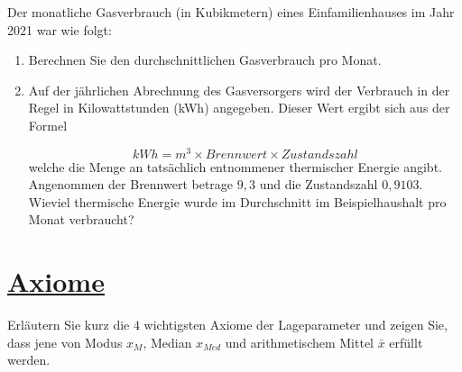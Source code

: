 \documentclass[12pt,a4paper]{article}
\newcommand{\tmpsection}[1]{}
\let\tmpsection=\section
\renewcommand{\section}[1]{\tmpsection{\underline{#1}} }
\begin{document}
Der monatliche Gasverbrauch (in Kubikmetern) eines Einfamilienhauses im
Jahr 2021 war wie folgt:

\FloatBarrier
\begin{table}[htp]
  \centering
\end{table}
\FloatBarrier

\begin{enumerate}[label=(\alph*)]
  \item Berechnen Sie den durchschnittlichen Gasverbrauch pro Monat.
  \item Auf der jährlichen Abrechnung des Gasversorgers wird der Verbrauch in der Regel in Kilowattstunden (kWh) angegeben. Dieser Wert ergibt sich aus der Formel
  
  $$kWh = m^3 \times Brennwert \times Zustandszahl$$
  welche die Menge an tatsächlich entnommener thermischer Energie angibt. Angenommen der Brennwert betrage $9,3$ und die Zustandszahl $0,9103$. Wieviel thermische Energie wurde im Durchschnitt im Beispielhaushalt pro Monat verbraucht?
\end{enumerate}

\hypertarget{axiome}{%
\section{Axiome}\label{axiome}}

Erläutern Sie kurz die \(4\) wichtigsten Axiome der Lageparameter und
zeigen Sie, dass jene von Modus \(x_M\), Median \(x_{Med}\) und
arithmetischem Mittel \(\bar{x}\) erfüllt werden.
\end{document}
